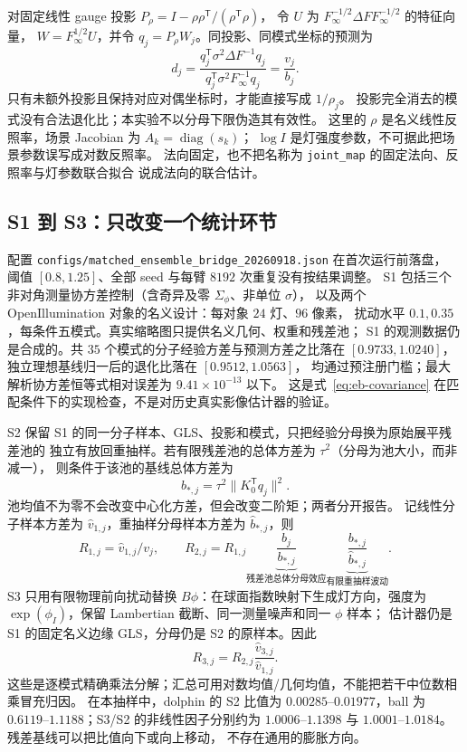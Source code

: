 对固定线性 gauge 投影 $P_\rho=I-\rho\rho^{\mathsf T}/(\rho^{\mathsf T}\rho)$，
令 $U$ 为 $F_\infty^{-1/2}\Delta F F_\infty^{-1/2}$ 的特征向量，
$W=F_\infty^{1/2}U$，并令 $q_j=P_\rho W_j$。同投影、同模式坐标的预测为
\begin{equation}
 d_j=\frac{q_j^{\mathsf T}\sigma^2\Delta F^{-1}q_j}
 {q_j^{\mathsf T}\sigma^2F_\infty^{-1}q_j}
 =\frac{v_j}{b_j}.
 \label{eq:eb-projected-ratio}
\end{equation}
只有未额外投影且保持对应对偶坐标时，才能直接写成 $1/\rho_j$。
投影完全消去的模式没有合法退化比；本实验不以分母下限伪造其有效性。
这里的 $\rho$ 是名义线性反照率，场景 Jacobian 为 $A_k=\operatorname{diag}(s_k)$；
$\log I$ 是灯强度参数，不可据此把场景参数误写成对数反照率。
法向固定，也不把名称为 \texttt{joint\_map} 的固定法向、反照率与灯参数联合拟合
说成法向的联合估计。

\subsection{S1 到 S3：只改变一个统计环节}
配置 \texttt{configs/matched\_ensemble\_bridge\_20260918.json} 在首次运行前落盘，
阈值 $[0.8,1.25]$、全部 seed 与每臂 $8192$ 次重复没有按结果调整。
S1 包括三个非对角测量协方差控制（含奇异及零 $\Sigma_\phi$、非单位 $\sigma$），
以及两个 OpenIllumination 对象的名义设计：每对象 $24$ 灯、$96$ 像素，
扰动水平 $0.1,0.35$，每条件五模式。真实缩略图只提供名义几何、权重和残差池；
S1 的观测数据仍是合成的。共 $35$ 个模式的分子经验方差与预测方差之比落在
$[0.9733,1.0240]$，独立理想基线归一后的退化比落在 $[0.9512,1.0563]$，
均通过预注册门槛；最大解析协方差恒等式相对误差为 $9.41\times10^{-13}$ 以下。
这是式~\eqref{eq:eb-covariance} 在匹配条件下的实现检查，不是对历史真实影像估计器的验证。

S2 保留 S1 的同一分子样本、GLS、投影和模式，只把经验分母换为原始展平残差池的
独立有放回重抽样。若有限残差池的总体方差为 $\tau^2$（分母为池大小，而非减一），
则条件于该池的基线总体方差为
\begin{equation}
 b_{*,j}=\tau^2\|K_0^{\mathsf T}q_j\|^2.
\end{equation}
池均值不为零不会改变中心化方差，但会改变二阶矩；两者分开报告。
记线性分子样本方差为 $\widehat v_{1,j}$，重抽样分母样本方差为 $\widehat b_{*,j}$，则
\begin{equation}
 R_{1,j}=\widehat v_{1,j}/v_j,\qquad
 R_{2,j}=R_{1,j}
 \underbrace{\frac{b_j}{b_{*,j}}}_{\text{残差池总体分母效应}}
 \underbrace{\frac{b_{*,j}}{\widehat b_{*,j}}}_{\text{有限重抽样波动}}.
 \label{eq:eb-s2}
\end{equation}
S3 只用有限物理前向扰动替换 $B\phi$：在球面指数映射下生成灯方向，强度为
$\exp(\phi_I)$，保留 Lambertian 截断、同一测量噪声和同一 $\phi$ 样本；
估计器仍是 S1 的固定名义边缘 GLS，分母仍是 S2 的原样本。因此
\begin{equation}
 R_{3,j}=R_{2,j}\frac{\widehat v_{3,j}}{\widehat v_{1,j}}.
 \label{eq:eb-s3}
\end{equation}
这些是逐模式精确乘法分解；汇总可用对数均值/几何均值，不能把若干中位数相乘冒充归因。
在本抽样中，dolphin 的 S2 比值为 $0.00285$--$0.01977$，ball 为
$0.6119$--$1.1188$；S3/S2 的非线性因子分别约为
$1.0006$--$1.1398$ 与 $1.0001$--$1.0184$。残差基线可以把比值向下或向上移动，
不存在通用的膨胀方向。

